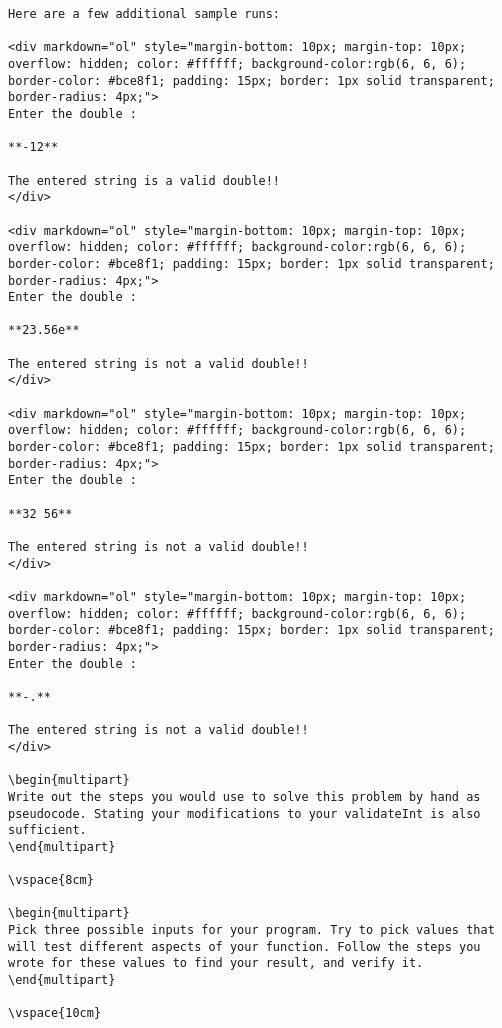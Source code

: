 {{{{{{{{{{\begin{problem}
\begin{verbatim}
Here are a few additional sample runs:

<div markdown="ol" style="margin-bottom: 10px; margin-top: 10px; overflow: hidden; color: #ffffff; background-color:rgb(6, 6, 6); border-color: #bce8f1; padding: 15px; border: 1px solid transparent; border-radius: 4px;">
Enter the double :

**-12**

The entered string is a valid double!!
</div>

<div markdown="ol" style="margin-bottom: 10px; margin-top: 10px; overflow: hidden; color: #ffffff; background-color:rgb(6, 6, 6); border-color: #bce8f1; padding: 15px; border: 1px solid transparent; border-radius: 4px;">
Enter the double :

**23.56e**

The entered string is not a valid double!!
</div>

<div markdown="ol" style="margin-bottom: 10px; margin-top: 10px; overflow: hidden; color: #ffffff; background-color:rgb(6, 6, 6); border-color: #bce8f1; padding: 15px; border: 1px solid transparent; border-radius: 4px;">
Enter the double :

**32 56**

The entered string is not a valid double!!
</div>

<div markdown="ol" style="margin-bottom: 10px; margin-top: 10px; overflow: hidden; color: #ffffff; background-color:rgb(6, 6, 6); border-color: #bce8f1; padding: 15px; border: 1px solid transparent; border-radius: 4px;">
Enter the double :

**-.**

The entered string is not a valid double!!
</div>

\begin{multipart}
Write out the steps you would use to solve this problem by hand as pseudocode. Stating your modifications to your validateInt is also sufficient.
\end{multipart}

\vspace{8cm}

\begin{multipart}
Pick three possible inputs for your program. Try to pick values that will test different aspects of your function. Follow the steps you wrote for these values to find your result, and verify it.
\end{multipart}

\vspace{10cm}


\end{verbatim}
\end{problem}}}}}}}}}}}
